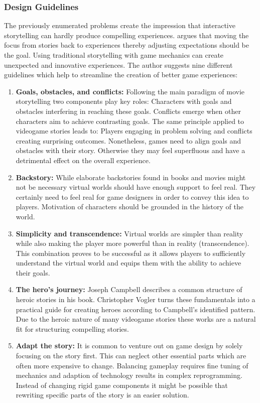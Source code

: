 \subsubsection{Design Guidelines} \label{sec:story-design}
The previously enumerated problems create the impression that interactive storytelling can hardly produce compelling experiences.
\citeauthor{Schell2014} argues that moving the focus from stories back to experiences thereby adjusting expectations should be the goal.
Using traditional storytelling with game mechanics can create unexpected and innovative experiences.
The author suggests nine different guidelines which help to streamline the creation of better game experiences:

\begin{enumerate}
    \item \textbf{Goals, obstacles, and conflicts:} Following the main paradigm of movie storytelling two components play key roles: Characters with goals and obstacles interfering in reaching these goals. Conflicts emerge when other characters aim to achieve contrasting goals. The same principle applied to videogame stories leads to: Players engaging in problem solving and conflicts creating surprising outcomes. Nonetheless, games need to align goals and obstacles with their story. Otherwise they may feel superfluous and have a detrimental effect on the overall experience.
    \item \textbf{Backstory:} While elaborate backstories found in books and movies might not be necessary virtual worlds should have enough support to feel real. They certainly need to feel real for game designers in order to convey this idea to players. Motivation of characters should be grounded in the history of the world.
    \item \textbf{Simplicity and transcendence:} Virtual worlds are simpler than reality while also making the player more powerful than in reality (transcendence). This combination proves to be successful as it allows players to sufficiently understand the virtual world and equips them with the ability to achieve their goals.
    \item \textbf{The hero's journey:} Joseph Campbell describes a common structure of heroic stories in his book. Christopher Vogler turns these fundamentals into a practical guide for creating heroes according to Campbell's identified pattern. Due to the heroic nature of many videogame stories these works are a natural fit for structuring compelling stories.
    \item \textbf{Adapt the story:} It is common to venture out on game design by solely focusing on the story first. This can neglect other essential parts which are often more expensive to change. Balancing gameplay requires fine tuning of mechanics and adaption of technology results in complex reprogramming. Instead of changing rigid game components it might be possible that rewriting specific parts of the story is an easier solution.

\end{enumerate}

